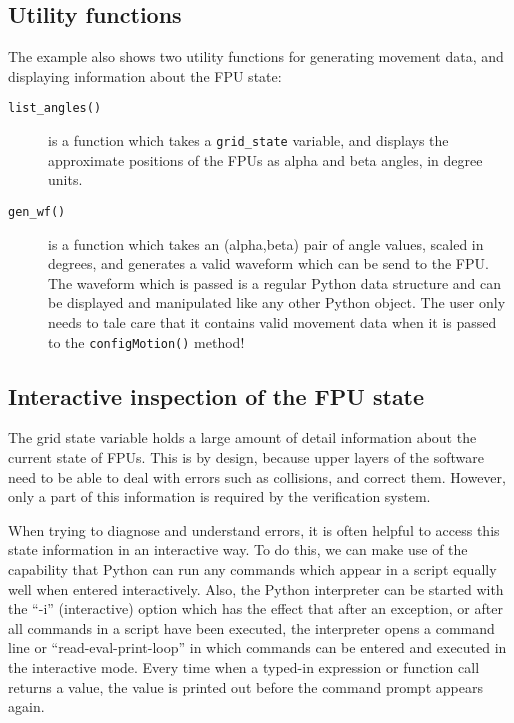 \documentclass{scrartcl}[12pt,a4paper]
\begin{document}
\subsection{Utility functions}

The example also shows two utility functions for generating movement
data, and displaying information about the FPU state:

\begin{description}
\item[\texttt{list\_angles()}] is a function which takes a \texttt{grid\_state}
  variable, and displays the approximate positions of the FPUs as
  alpha and beta angles, in degree units.

\item[\texttt{gen\_wf()}] is a function which takes an (alpha,beta)
  pair of angle values, scaled in degrees, and generates a valid
  waveform which can be send to the FPU.  The waveform which is passed
  is a regular Python data structure and can be displayed and
  manipulated like any other Python object.  The user only needs to
  tale care that it contains valid movement data when it is passed to
  the \texttt{configMotion()} method!

\end{description}

\subsection{Interactive inspection of the FPU state}

\label{sec:fpustate}
The grid state variable holds a large amount of detail information
about the current state of FPUs. This is by design, because upper
layers of the software need to be able to deal with errors such as
collisions, and correct them. However, only a part of this information
is required by the verification system.

When trying to diagnose and understand errors, it is often helpful to
access this state information in an interactive way.  To do this, we
can make use of the capability that Python can run any commands which
appear in a script equally well when entered interactively. Also, the
Python interpreter can be started with the ``-i'' (interactive) option
which has the effect that after an exception, or after all commands in
a script have been executed, the interpreter opens a command line or
``read-eval-print-loop''
in which commands can be entered and executed
in the interactive mode. Every time when a typed-in expression or
function call returns a value, the value is printed out before the
command prompt appears again.
\end{document}
